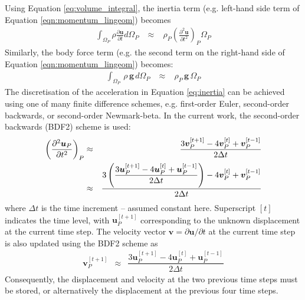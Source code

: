 \documentclass[sn-mathphys,Numbered]{sn-jnl}%
\newcommand{\bb}{\boldsymbol}
\begin{document}
Using Equation \ref{eq:volume_integral}, the inertia term (e.g. left-hand side term of Equation \ref{eqn:momentum_lingeom}) becomes
\begin{eqnarray} \label{eq:inertia}
	\int_{\Omega_P} \rho \frac{\partial \bb{u} }{\partial t}  d \Omega_P
	\;&\approx&\;
	\rho_P \left(\frac{\partial^2 \bb{u} }{\partial t^2}\right)_P  \Omega_P
\end{eqnarray}
Similarly, the body force term (e.g. the second term on the right-hand side of Equation \ref{eqn:momentum_lingeom}) becomes:
\begin{eqnarray}
	\int_{\Omega_P} \, \rho \, \bb{g} \,  d \Omega_P
	\;&\approx&\;
	\rho_P \, \bb{g}\,  \Omega_P
\end{eqnarray}
The discretisation of the acceleration in Equation \ref{eq:inertia} can be achieved using one of many finite difference schemes, e.g. first-order Euler, second-order backwards, or second-order Newmark-beta.
In the current work, the second-order backwards (BDF2) scheme is used:
\begin{eqnarray} \label{eq:inertia2}
	\left(\frac{\partial^2 \boldsymbol{u}_P}{\partial t^2}\right)_P
	&\approx& \frac{3\boldsymbol{v}_P^{[t+1]} - 4\boldsymbol{v}_P^{[t]} + \boldsymbol{v}_P^{[t-1]}}{2\Delta t} \notag \\
	&\approx&
	\frac{3\left( 
		\dfrac{3\boldsymbol{u}_P^{[t+1]} - 4\boldsymbol{u}_P^{[t]} + \boldsymbol{u}_P^{[t-1]}}{2\Delta t} 
		\right) 
	- 4\boldsymbol{v}_P^{[t]} + \boldsymbol{v}_P^{[t-1]}}{2\Delta t}
\end{eqnarray}
where $\Delta t$ is the time increment -- assumed constant here.
Superscript $[t]$ indicates the time level, with $\bb{u}_P^{[t+1]}$ corresponding to the unknown displacement at the current time step.
 The velocity vector $\bb{v} = \partial \bb{u}/\partial t$ at the current time step is also updated using the BDF2 scheme as
 \begin{eqnarray}
	\boldsymbol{v}_P^{[t+1]}	&\approx&
		\dfrac{3\boldsymbol{u}_P^{[t+1]} - 4\boldsymbol{u}_P^{[t]} + \boldsymbol{u}_P^{[t-1]}}{2\Delta t} 
\end{eqnarray}
Consequently, the displacement and velocity at the two previous time steps must be stored, or alternatively the displacement at the previous four time steps.
\end{document}
